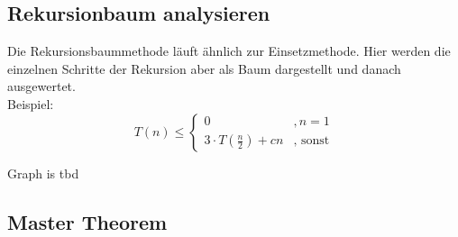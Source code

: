 \subsection{Rekursionbaum analysieren}

Die Rekursionsbaummethode läuft ähnlich zur Einsetzmethode. Hier werden die einzelnen Schritte der Rekursion aber als Baum dargestellt und danach ausgewertet.\\
Beispiel:\\
$$
T(n) \leq \left\{ 
\begin{array}{lr}
0 &, n = 1\\
3 \cdot T (\frac{n}{2} ) + cn & \text{, sonst}
\end{array}
\right.
$$


Graph is tbd

\subsection{Master Theorem}

